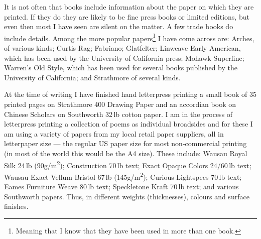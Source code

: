 \documentclass[10pt,letterpaper,extrafontsizes]{memoir}
\newcommand*{\sqrd}[1]{#1\textsuperscript{2}}
\newcommand*{\gsm}{g/\sqrd{m}}
\newcommand\U[2]{\textrm{#1}\,\textrm{#2}}
\begin{document}
    It is not often that books include information about the paper on which
they are printed. If they do they are likely to be fine press books or 
limited editions, but even then most I have seen are silent on the matter. 
A few trade books do include details. Among the more popular 
papers\footnote{Meaning that I know that they have been used in more than
one book.} I have
come across are: 
Arches, of various kinds; 
Curtis Rag;
Fabriano;
Glatfelter;
Linweave Early American, which
has been used by the University of California press;
Mohawk Superfine;
Warren's Old Style, which has been used for 
several books published by the University of California; and 
Strathmore of several kinds.

   At the time of writing I have finished hand letterpress printing a 
small book of 35 printed pages on Strathmore 400 Drawing Paper and an 
accordian book on Chinese Scholars on Southworth 
\U{32}{lb} cotton paper. I am in the process of letterpress printing a collection
of poems as individual broadsides and for these I am using a variety of
papers from my local retail paper suppliers, all in letterpaper size ---
the regular US paper size for most non-commercial printing (in most of the 
world this would be the A4 size). These include: Wausau Royal Silk \U{24}{lb}
(90\gsm);
Construction \U{70}{lb} text; Exact Opaque Colors 24/\U{60}{lb} text; Wausau Exact 
Vellum Bristol \U{67}{lb} (145\gsm); Curious Lightspecs \U{70}{lb} text; Eames Furniture
Weave \U{80}{lb} text; Speckletone Kraft \U{70}{lb} text; and various Southworth papers. 
Thus, in different weights (thicknesses), colours and surface finishes.
\end{document}
